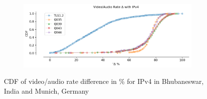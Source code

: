 \begin{frame}
\begin{figure}[!htb]
\begin{subfigure}{0.45\textwidth}
    \end{subfigure}
    \begin{subfigure}{0.45\textwidth}
        \includegraphics[width=\linewidth]{./plots/youtube/munich/graph_rate_diff.png}
    \end{subfigure}    
    \caption{CDF of video/audio rate difference in \% for IPv4 in Bhubaneswar, India and Munich, Germany}\label{fig:cdf-of-video-audio}
\end{figure}

%
%    
\end{frame}
\clearpage
